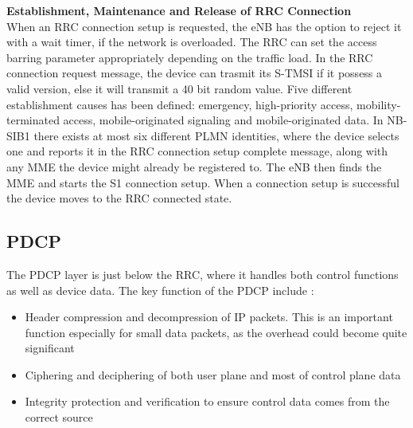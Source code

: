 \textbf{Establishment, Maintenance and Release of \gls{RRC} Connection} \\
When an \gls{RRC} connection setup is requested, the \gls{eNB} has the option to reject it with a wait timer, if the network is overloaded. The \gls{RRC} can set the access barring parameter appropriately depending on the traffic load. In the \gls{RRC} connection request message, the device can trasmit its \gls{S-TMSI} if it possess a valid version, else it will transmit a 40 bit random value. Five different establishment causes has been defined: emergency, high-priority access, mobility-terminated access, mobile-originated signaling and mobile-originated data. In \gls{NB-SIB}1 there exists at most six different \gls{PLMN} identities, where the device selects one and reports it in the  \gls{RRC} connection setup complete message, along with any \gls{MME} the device might already be registered to. The \gls{eNB} then finds the \gls{MME} and starts the S1 connection setup. When a connection setup is successful the device moves to the \gls{RRC} connected state. \citep[ch. 6.6]{book_LTE_for_UMTS}





\subsection{PDCP}
The \gls{PDCP} layer is just below the \gls{RRC}, where it handles both control functions as well as device data. The key function of the \gls{PDCP} include \citep[ch. 6.5]{book_LTE_for_UMTS}:
\begin{itemize}
	\item Header compression and decompression of \gls{IP} packets. This is an important function especially for small data packets, as the overhead could become quite significant
	\item Ciphering and deciphering of both user plane and most of control plane data
	\item Integrity protection and verification to ensure control data comes from the correct source
\end{itemize}


